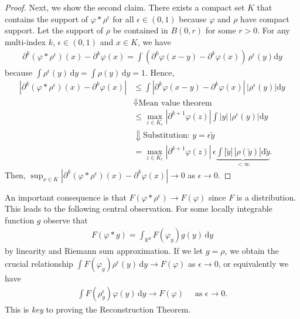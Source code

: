 \begin{proof}
    Next, we show the second claim. There exists a compact set \(K\) that contains the support of \(\varphi * \rho^{\epsilon}\) for all \(\epsilon \in (0,1)\) because \( \varphi \) and \( \rho \) have compact support. Let the support of \({\rho}\) be contained in \(B(0,r)\) for some \(r > 0\). For any multi-index \(k\), \(\epsilon \in (0,1)\) and \(x \in K\), we have
    \begin{align*}
        \partial^k(\varphi * \rho^\epsilon) (x) - \partial^k\varphi(x) = \int (\partial^k \varphi(x - y) - \partial^k \varphi(x)) \, \rho^{\epsilon}(y) \mathrm{d}y
    \end{align*}
    because \(\int \rho^{\epsilon}(y) \, \mathrm{d} y = \int \rho(y) \, \mathrm{d} y = 1\). Hence, 
    \begin{align*}
        |\partial^k(\varphi * \rho^\epsilon) (x) - \partial^k\varphi(x)| 
        &\leq \int |\partial^k \varphi(x - y) - \partial^k \varphi(x)| \, |\rho^{\epsilon}(y)| \mathrm{d}y \\
        &\Downarrow \text{Mean value theorem} \\
        & \leq \max_{z \in K_r} |\partial^{k+1}\varphi(z)|  \int  |y| \, |\rho^{\epsilon}(y)| \mathrm{d}y \\
        &\Downarrow \text{Substitution: } y = \epsilon \tilde y \\
        &= \max_{z \in K_r} |\partial^{k+1}\varphi(z)| \, \epsilon  \underbrace{\int  |\tilde y| \, |\rho(\tilde y)| \mathrm{d}\tilde y}_{< \infty}.
    \end{align*}
    Then, \(\sup_{x \in K} |\partial^k(\varphi * \rho^\epsilon) (x) - \partial^k\varphi(x)| \to 0\) as \(\epsilon \to 0\).
\end{proof}

An important consequence is that \(F(\varphi * \rho^{\epsilon}) \to F(\varphi)\) since \(F\) is a distribution. This leads to the following central observation. For some locally integrable function \( g \) observe that 
\begin{align}\label{lemma:mollified-distribution}
    F(\varphi * g) = \int_{\mathbb{R}^d} F(\varphi_y)g(y) \, \mathrm{d}y
\end{align}
by linearity and Riemann sum approximation. If we let \(g = {\rho}\), we obtain the crucial relationship \(\int F(\varphi_y)\rho^{\epsilon}(y) \, \mathrm{d}y \to F(\varphi)\) as \(\epsilon \to 0\), or equivalently we have
\begin{align}\label{eq:starting-point}
    \int F(\rho_y^\epsilon) \varphi(y)\, \mathrm{d}y \to F(\varphi) \quad \text{ as } \epsilon \to 0.
\end{align}
This is \emph{key} to proving the Reconstruction Theorem. 

